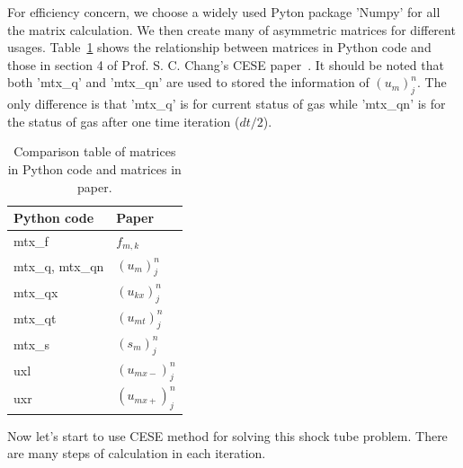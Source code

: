 \documentclass[a4paper,12pt]{article}
\begin{document}
For efficiency concern, we choose a widely used Pyton package 'Numpy' for all the 
matrix calculation. We then create many of asymmetric matrices for different usages. 
Table~\ref{tab:mtx_comparision} shows the relationship between matrices in Python 
code and those in section 4 of Prof. S. C. Chang's CESE paper~\cite{CESE_Shin_Chung_Chang_1995}. 
It should be noted that both 'mtx\_q' and 'mtx\_qn' are used to stored the 
information of $(u_{m})^{n}_{j}$. The only difference is that 'mtx\_q' is for 
current status of gas while 'mtx\_qn' is for the status of gas after one time 
iteration ($dt/2$).

\begin{table}[ht]
\begin{center}
\caption{Comparison table of matrices in Python code and matrices in paper. 
        \label{tab:mtx_comparision}}
\begin{tabular}{l|l}
\hline\hline
Python code         & Paper \\\hline
mtx\_f              & $f_{m,k}$ \\
mtx\_q, mtx\_qn     & $(u_{m})^{n}_{j}$ \\ 
mtx\_qx             & $(u_{kx})^{n}_{j}$ \\
mtx\_qt             & $(u_{mt})^{n}_{j}$ \\
mtx\_s              & $(s_{m})^{n}_{j}$ \\
uxl                 & $(u_{mx-})^{n}_{j}$ \\
uxr                 & $(u_{mx+})^{n}_{j}$ \\
\hline\hline
\end{tabular}
\end{center}
\end{table}

Now let's start to use CESE method for solving this shock tube problem. 
There are many steps of calculation in each iteration.
\end{document}

